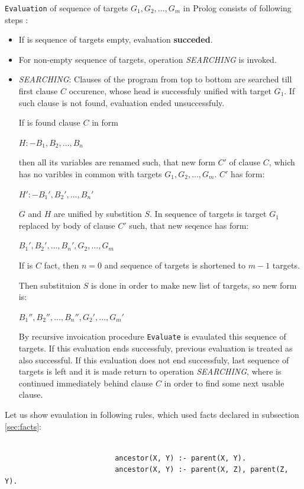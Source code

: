 \documentclass[11pt,twoside,a4paper]{book}
\begin{document}
\verb|Evaluation| of sequence of targets $G_1, G_2,..., G_m$ in Prolog consists
of following steps \cite{kolar:jui}:
\begin{itemize}
  \item If is sequence of targets empty, evaluation \textbf{succeded}.
  \item For non-empty sequence of targets, operation \textit{SEARCHING} is
  invoked.
  \item \textit{SEARCHING}: Clauses of the program from top to bottom are
  searched till first clause $C$ occurence, whose head is successfuly
  unified with target $G_1$. If such clause is not found, evaluation ended
  unsuccessfuly.
  
  If is found clause $C$ in form
 \begin{center}
                          $H :- B_1, B_2,\ldots, B_n$
\end{center}
then all its variables are renamed such, that new form $C'$ of clause $C$, which
has no varibles in common with targets $G_1, G_2,..., G_m$. $C'$ has form:
\begin{center}
                          $H' :- B_1', B_2',\ldots, B_n'$
\end{center}
$G$ and $H$ are unified by substition $S$.
In sequence of targets is target $G_1$ replaced by body of clause $C'$ such,
that new seqence has form:
\begin{center}
                          $B_1', B_2',\ldots, B_n', G_2,\ldots, G_m$
\end{center}
If is $C$ fact, then $n = 0$ and sequence of targets is shortened to $m - 1$
targets.

Then substituion $S$ is done in order to make new list of targets, so new form
is:
\begin{center}
                          $B_1'', B_2'',\ldots, B_n'', G_2',\ldots, G_m'$
\end{center}


By recursive invoication procedure \verb|Evaluate| is evaulated this sequence of
targets. If this evaluation ends successfuly, previous evaluation is treated as
also successful. If this evaluation does not end successfuly, last sequence of
targets is left and it is made return to operation \textit{SEARCHING}, where is
continued immediately behind clause $C$ in order to find some next usable
clause.
\end{itemize}
Let us show evaulation in following rules, which used facts declared in
subsection \ref{sec:facts}:\\
\\
\begin{verbatim}
                          ancestor(X, Y) :- parent(X, Y).
                          ancestor(X, Y) :- parent(X, Z), parent(Z, Y).
\end{verbatim}
\end{document}
